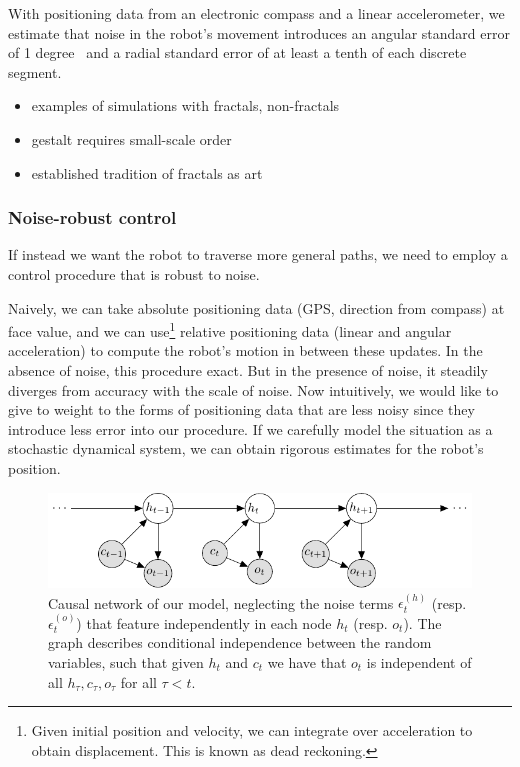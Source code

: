         With positioning data from an electronic compass and a linear accelerometer, we estimate that noise in the robot's movement introduces an angular standard error of 1 degree~\cite{??} and %
        a radial standard error of at least a tenth of each discrete segment.

        \begin{itemize}
            \item examples of simulations with fractals, non-fractals
            \item gestalt requires small-scale order
            \item established tradition of fractals as art
        \end{itemize}


        \subsubsection{Noise-robust control}
        If instead we want the robot to traverse more general paths, we need to employ a control procedure that is robust to noise.

        Naively, we can take absolute positioning data (GPS, direction from compass) at face value, and we can use\footnote{Given initial position and velocity, we can integrate over acceleration to obtain displacement. This is known as dead reckoning.} relative positioning data (linear and angular acceleration) to compute the robot's motion in between these updates.
        In the absence of noise, this procedure exact.
        But in the presence of noise, it steadily diverges from accuracy with the scale of noise.
        Now intuitively, we would like to give to weight to the forms of positioning data that are less noisy since they introduce less error into our procedure.
        If we carefully model the situation as a stochastic dynamical system, we can obtain rigorous estimates for the robot's position.

        \newcommand\ndistr[2]{\mathcal{N}(#1, #2)}
        \newcommand\noise[1]{\epsilon^{(#1)}}

        \begin{figure}[h]
            \includegraphics{Files/graphical_model/graphical_model}
            \caption{Causal network of our model, neglecting the noise terms $\noise{h}_t$ (resp. $\noise{o}_t$) that feature independently in each node $h_t$ (resp. $o_t$).
            The graph describes conditional independence between the random variables, such that given $h_t$ and $c_t$ we have that $o_t$ is independent of all $h_\tau, c_\tau, o_\tau$ for all $\tau < t$.}
            \label{fig:SSM}
        \end{figure}

